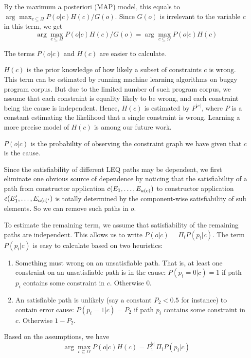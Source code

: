 By the maximum a posteriori (MAP) model, this equals to $\arg\max_{c \subseteq
\Omega} P(o|c) H(c) / G(o)$. Since $G(o)$ is irrelevant to the variable $c$ in
this term, we get
\[\arg\max_{c \subseteq \Omega} P(o|c) H(c) / G(o) =  \arg\max_{c
\subseteq \Omega} P(o|c) H(c)\]

The terms $P(o|c)$ and $H(c)$ are easier to calculate.

$H(c)$ is the prior knowledge of how likely a subset of constraints $c$ is
wrong. This term can be estimated by running machine learning algorithms on
buggy program corpus. But due to the limited number of such program corpus, we
assume that each constraint is equality likely to be wrong, and each constraint
being the cause is independent. Hence, $H(c)$ is estimated by $P^{|c|}$, where
$P$ is a constant estimating the likelihood that a single constraint is wrong.
Learning a more precise model of $H(c)$ is among our future work.

$P(o|c)$ is the probability of observing the constraint graph we have given
that $c$ is the cause.

Since the satisfiability of different LEQ paths may be dependent, we first
eliminate one obvious source of dependence by noticing that the satisfiability
of a path from constructor application $c(E_1, \dots, E_{a(c)})$ to
constructor application $c(E_1', \dots, E_{a(c)'})$ is totally determined
by the component-wise satisfiability of sub elements. So we can remove such
paths in $o$.

To estimate the remaining term, we assume that satisfiability of the remaining
paths are independent. This allows us to write $P(o|c) = \Pi_i P(p_i|c)$. The
term $P(p_i|c)$ is easy to calculate based on two heuristics:

\begin{enumerate}
\item Something must wrong on an unsatisfiable path. That is, at least one
constraint on an unsatisfiable path is in the cause: $P(p_i=0|c) = 1$ if path
$p_i$ contains some constraint in $c$. Otherwise 0.

\item An satisfiable path is unlikely (say a constant $P_2<0.5$ for instance)
to contain error cause: $P(p_i=1|c) = P_2$ if path $p_i$ contains some
constraint in $c$.  Otherwise $1-P_2$.  
\end{enumerate}

Based on the assumptions, we have
\[\arg\max_{c \subseteq \Omega} P(o|c) H(c) = P_1^{|c|} \Pi_i P(p_i|c) \]

